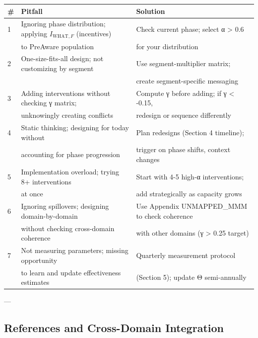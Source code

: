 \begin{center}
\begin{tabular}{@{}lp{8cm}l@{}}
\toprule
\textbf{\#} & \textbf{Pitfall} & \textbf{Solution} \\
\midrule
1 & Ignoring phase distribution; applying $I_{\text{WHAT},F}$ (incentives) & Check current phase; select α > 0.6 \\
  & to PreAware population & for your distribution \\
\midrule
2 & One-size-fits-all design; not customizing by segment & Use segment-multiplier matrix; \\
  & & create segment-specific messaging \\
\midrule
3 & Adding interventions without checking γ matrix; & Compute γ before adding; if γ < -0.15, \\
  & unknowingly creating conflicts & redesign or sequence differently \\
\midrule
4 & Static thinking; designing for today without & Plan redesigns (Section 4 timeline); \\
  & accounting for phase progression & trigger on phase shifts, context changes \\
\midrule
5 & Implementation overload; trying 8+ interventions & Start with 4-5 high-α interventions; \\
  & at once & add strategically as capacity grows \\
\midrule
6 & Ignoring spillovers; designing domain-by-domain & Use Appendix UNMAPPED_MMM to check coherence \\
  & without checking cross-domain coherence & with other domains (γ > 0.25 target) \\
\midrule
7 & Not measuring parameters; missing opportunity & Quarterly measurement protocol \\
  & to learn and update effectiveness estimates & (Section 5); update Θ semi-annually \\
\midrule
\end{tabular}
\end{center}

---


\subsection*{References and Cross-Domain Integration}

